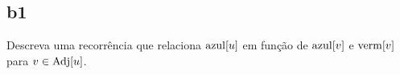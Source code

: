 \subsection{b1}

Descreva uma recorrência que relaciona $\mathrm{azul}[u]$ em função de $\mathrm{azul}[v]$ e $\mathrm{verm}[v]$ para $v \in \operatorname{Adj}[u]$.

\itemdsep[0.25]
